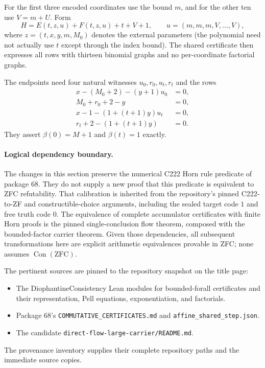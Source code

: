 For the first three encoded coordinates use the bound $m$, and for the
other ten use $V=m+U$.  Form
\[
 H=E(t,z,u)+F(t,z,u)+t+V+1,
 \qquad u=(m,m,m,V,\ldots,V),
\]
where $z=(t,x,y,m,M_0)$ denotes the external parameters (the polynomial
need not actually use $t$ except through the index bound).
The shared certificate then expresses all rows with thirteen binomial
graphs and no per-coordinate factorial graphs.

The endpoints need four natural witnesses $u_0,r_0,u_t,r_t$ and the rows
\begin{align*}
 x-(M_0+2)-(y+1)u_0&=0,\\
 M_0+r_0+2-y&=0,\\
 x-1-(1+(t+1)y)u_t&=0,\\
 r_t+2-(1+(t+1)y)&=0.
\end{align*}
They assert $\beta(0)=M+1$ and $\beta(t)=1$ exactly.

\paragraph{Logical dependency boundary.}
The changes in this section preserve the numerical C222 Horn rule predicate
of package 68.  They do not supply a new proof that this predicate is
equivalent to ZFC refutability.  That calibration is inherited from the
repository's pinned C222-to-ZF and constructible-choice arguments, including
the sealed target code $1$ and free truth code $0$.  The equivalence of
complete accumulator certificates with finite Horn proofs is the pinned
single-conclusion flow theorem, composed with the bounded-factor carrier
theorem.  Given those dependencies, all subsequent transformations here are
explicit arithmetic equivalences provable in ZFC; none assumes
$\operatorname{Con}(\mathrm{ZFC})$.

The pertinent sources are pinned to the repository snapshot on the
title page:
\begin{itemize}
\item The DiophantineConsistency Lean modules for bounded-forall
      certificates and their representation, Pell equations,
      exponentiation, and factorials.
\item Package 68's \nolinkurl{COMMUTATIVE_CERTIFICATES.md} and
      \nolinkurl{affine_shared_step.json}.
\item The candidate \nolinkurl{direct-flow-large-carrier/README.md}.
\end{itemize}
The provenance inventory supplies their complete repository paths and
the immediate source copies.

